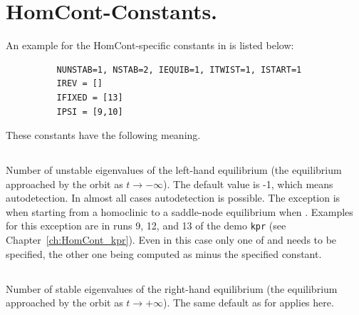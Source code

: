 \documentclass[12pt]{report}
\begin{document}
\section{ {\cal HomCont}-Constants.} \label{sec:HomCont_Constants}
An example for the HomCont-specific constants in  is listed below:
\begin{verbatim}
          NUNSTAB=1, NSTAB=2, IEQUIB=1, ITWIST=1, ISTART=1
          IREV = []
          IFIXED = [13]
          IPSI = [9,10]
\end{verbatim}
These constants have the following meaning. 

\subsection{}  \label{sec:NUNSTAB}

Number of unstable eigenvalues of the left-hand equilibrium (the equilibrium 
approached by the orbit as $t \to -\infty$). The default value is -1,
which means autodetection. In almost all cases autodetection is
possible. The exception is when starting from a homoclinic to a
saddle-node equilibrium when . Examples for this
exception are in runs 9, 12, and 13 of the
demo \texttt{kpr} (see Chapter~\ref{ch:HomCont_kpr}).
Even in this case
only one of  and  needs to be specified, the
other one being computed as  minus the specified constant.

\subsection{}  \label{sec:NSTAB}
Number of stable eigenvalues of the right-hand equilibrium (the equilibrium
approached by the orbit as $t \to +\infty$). The same default as for
 applies here.
\end{document}
